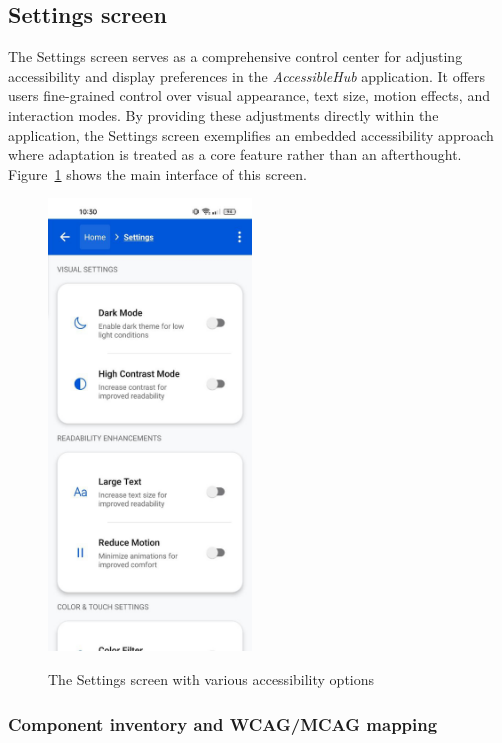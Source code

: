 \subsection{Settings screen}
\label{subsec:settings-screen}

The Settings screen serves as a comprehensive control center for adjusting accessibility and display preferences in the \textit{AccessibleHub} application. It offers users fine-grained control over visual appearance, text size, motion effects, and interaction modes. By providing these adjustments directly within the application, the Settings screen exemplifies an embedded accessibility approach where adaptation is treated as a core feature rather than an afterthought. Figure~\ref{fig:settings_screen_main} shows the main interface of this screen.

\begin{figure}[ht]
    \centering
    \includegraphics[width=0.48\textwidth, alt={Settings screen showing accessibility options}]{img/settings_normal.jpg}
    \caption{The Settings screen with various accessibility options}
    \label{fig:settings_screen_main}
\end{figure}

\FloatBarrier

\subsubsection{Component inventory and WCAG/MCAG mapping}

